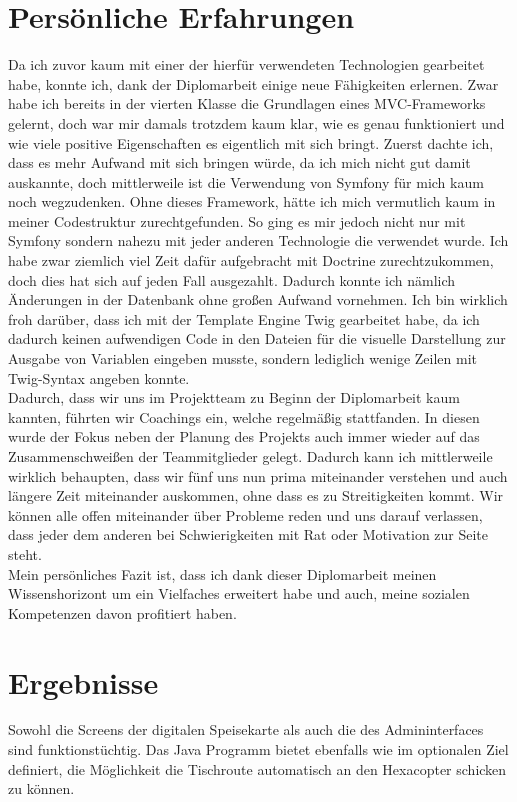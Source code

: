 \section{Persönliche Erfahrungen}
Da ich zuvor kaum mit einer der hierfür verwendeten Technologien gearbeitet habe, konnte ich, dank der Diplomarbeit einige neue Fähigkeiten erlernen.
Zwar habe ich bereits in der vierten Klasse die Grundlagen eines MVC-Frameworks gelernt, doch war mir damals trotzdem kaum klar, wie es genau funktioniert und wie viele positive Eigenschaften es eigentlich mit sich bringt.
Zuerst dachte ich, dass es mehr Aufwand mit sich bringen würde, da ich mich nicht gut damit auskannte, doch mittlerweile ist die Verwendung von Symfony für mich kaum noch wegzudenken. Ohne dieses Framework, hätte ich mich vermutlich kaum in meiner Codestruktur zurechtgefunden.
So ging es mir jedoch nicht nur mit Symfony sondern nahezu mit jeder anderen Technologie die verwendet wurde. 
Ich habe zwar ziemlich viel Zeit dafür aufgebracht mit Doctrine zurechtzukommen, doch dies hat sich auf jeden Fall ausgezahlt. Dadurch konnte ich nämlich Änderungen in der Datenbank ohne großen Aufwand vornehmen. 
Ich bin wirklich froh darüber, dass ich mit der Template Engine Twig gearbeitet habe, da ich dadurch keinen aufwendigen Code in den Dateien für die visuelle Darstellung zur Ausgabe von Variablen eingeben musste, sondern lediglich wenige Zeilen mit Twig-Syntax angeben konnte.
\\
Dadurch, dass wir uns im Projektteam zu Beginn der Diplomarbeit kaum kannten, führten wir Coachings ein, welche regelmäßig stattfanden. In diesen wurde der Fokus neben der Planung des Projekts auch immer wieder auf das Zusammenschweißen der Teammitglieder gelegt. Dadurch kann ich mittlerweile wirklich behaupten, dass wir fünf uns nun prima miteinander verstehen und auch längere Zeit miteinander auskommen, ohne dass es zu Streitigkeiten kommt. Wir können alle offen miteinander über Probleme reden und uns darauf verlassen, dass jeder dem anderen bei Schwierigkeiten mit Rat oder Motivation zur Seite steht.
\\
Mein persönliches Fazit ist, dass ich dank dieser Diplomarbeit meinen Wissenshorizont um ein Vielfaches erweitert habe und auch, meine sozialen Kompetenzen davon profitiert haben. 

\section{Ergebnisse}
Sowohl die Screens der digitalen Speisekarte als auch die des Admininterfaces sind funktionstüchtig.
Das Java Programm bietet ebenfalls wie im optionalen Ziel definiert, die Möglichkeit die Tischroute automatisch an den Hexacopter schicken zu können.
